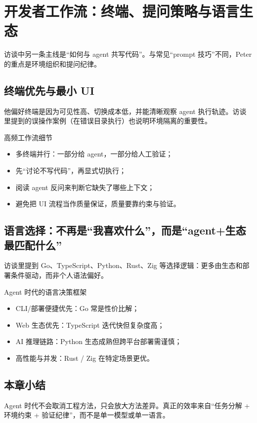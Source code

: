 \section{开发者工作流：终端、提问策略与语言生态}

访谈中另一条主线是“如何与 agent 共写代码”。与常见“prompt 技巧”不同，Peter 的重点是环境组织和提问纪律。

\subsection{终端优先与最小 UI}

他偏好终端是因为可见性高、切换成本低，并能清晰观察 agent 执行轨迹。访谈里提到的误操作案例（在错误目录执行）也说明环境隔离的重要性。

\begin{knowledgebox}{高频工作流细节}
\begin{itemize}
    \item 多终端并行：一部分给 agent，一部分给人工验证；
    \item 先“讨论不写代码”，再显式切执行；
    \item 阅读 agent 反问来判断它缺失了哪些上下文；
    \item 避免把 UI 流程当作质量保证，质量要靠约束与验证。
\end{itemize}
\end{knowledgebox}

\subsection{语言选择：不再是“我喜欢什么”，而是“agent+生态最匹配什么”}

访谈里提到 Go、TypeScript、Python、Rust、Zig 等选择逻辑：更多由生态和部署条件驱动，而非个人语法偏好。

\begin{importantbox}{Agent 时代的语言决策框架}
\begin{itemize}
    \item CLI/部署便捷优先：Go 常是性价比解；
    \item Web 生态优先：TypeScript 迭代快但复杂度高；
    \item AI 推理链路：Python 生态成熟但跨平台部署需谨慎；
    \item 高性能与并发：Rust / Zig 在特定场景更优。
\end{itemize}
\end{importantbox}

\subsection{本章小结}
Agent 时代不会取消工程方法，只会放大方法差异。真正的效率来自“任务分解 + 环境约束 + 验证纪律”，而不是单一模型或单一语言。

